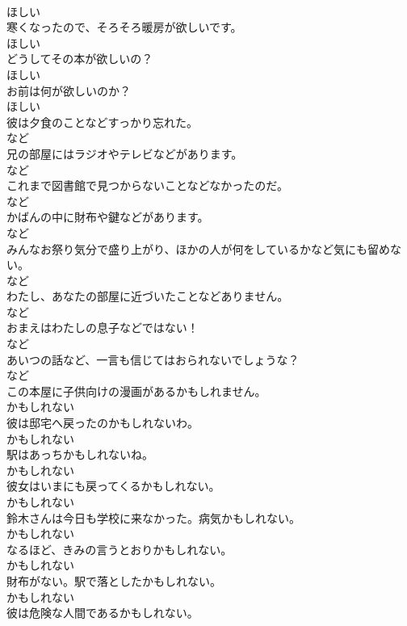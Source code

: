 \documentclass[8pt]{extreport}
\begin{document}
\begin{CJK}{UTF8}{min}
\\	ほしい
\\	寒くなったので、そろそろ暖房が欲しいです。	
\\	ほしい
\\	どうしてその本が欲しいの？	
\\	ほしい
\\	お前は何が欲しいのか？	
\\	ほしい
\\	彼は夕食のことなどすっかり忘れた。	
\\	など
\\	兄の部屋にはラジオやテレビなどがあります。	
\\	など
\\	これまで図書館で見つからないことなどなかったのだ。	
\\	など
\\	かばんの中に財布や鍵などがあります。	
\\	など
\\	みんなお祭り気分で盛り上がり、ほかの人が何をしているかなど気にも留めない。	
\\	など
\\	わたし、あなたの部屋に近づいたことなどありません。	
\\	など
\\	おまえはわたしの息子などではない！	
\\	など
\\	あいつの話など、一言も信じてはおられないでしょうな？	
\\	など
\\	この本屋に子供向けの漫画があるかもしれません。	
\\	かもしれない
\\	彼は邸宅へ戻ったのかもしれないわ。	
\\	かもしれない
\\	駅はあっちかもしれないね。	
\\	かもしれない
\\	彼女はいまにも戻ってくるかもしれない。	
\\	かもしれない
\\	鈴木さんは今日も学校に来なかった。病気かもしれない。	
\\	かもしれない
\\	なるほど、きみの言うとおりかもしれない。	
\\	かもしれない
\\	財布がない。駅で落としたかもしれない。	
\\	かもしれない
\\	彼は危険な人間であるかもしれない。	

\end{CJK}
\end{document}
